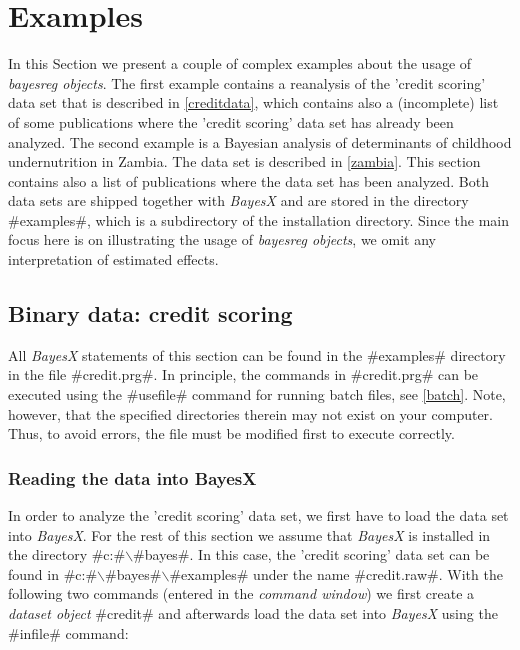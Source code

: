 \section{Examples}
\label{bayesregexamples}

In this Section we present a couple of complex examples about the
usage of {\em bayesreg objects}. The first example contains a
reanalysis of the 'credit scoring' data set that is described in
\autoref{creditdata}, which contains also a (incomplete) list of
some publications where the 'credit scoring' data set has already
been analyzed. The second example is a Bayesian analysis of
determinants of childhood undernutrition in Zambia. The data set
is described in \autoref{zambia}. This section contains also a
list of publications where the data set has been analyzed. Both
data sets are shipped together with {\em BayesX} and are stored in
the directory #examples#, which is a subdirectory of the
installation directory. Since the main focus here is on
illustrating the usage of {\em bayesreg objects}, we omit any
interpretation of estimated effects.


\subsection{Binary data: credit scoring}
\label{creditanalyse}

All {\em BayesX} statements of this section can be found in the
#examples# directory in the file #credit.prg#. In principle, the
commands in #credit.prg# can be executed using the #usefile#
command for running batch files, see \autoref{batch}. Note,
however, that the specified directories therein may not exist on
your computer. Thus, to avoid errors, the file must be modified
first to execute correctly.

\subsubsection{Reading the data into BayesX}


In order to analyze the 'credit scoring' data set, we first have
to load the data set into {\em BayesX}. For the rest of this
section we assume that {\em BayesX} is installed in the directory
#c:#$\backslash$#bayes#. In this case, the 'credit scoring' data
set can be found in #c:#$\backslash$#bayes#$\backslash$#examples#
under the name #credit.raw#. With the following two commands
(entered in the {\em command window}) we first create a {\em
dataset object} #credit# and afterwards load the data set into
{\em BayesX} using the #infile# command:

